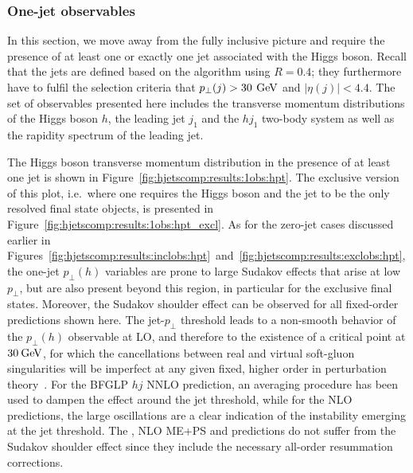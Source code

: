 \subsubsection{One-jet observables}
\label{sec:hjetscomp:results:1jobs}

In this section, we move away from the fully inclusive picture and
require the presence of at least one or exactly one jet associated with 
the Higgs boson. Recall that the jets are defined based on the
\antikt algorithm using $R=0.4$; they furthermore have to fulfil the selection
criteria that $p_\perp(j)>30\,\text{\:GeV}$ and $|\eta(j)|<4.4$. The set of
observables presented here includes the transverse momentum
distributions of the Higgs boson $h$, the leading jet $j_1$ and the
$hj_1$ two-body system as well as the rapidity spectrum of the leading
jet.

The Higgs boson transverse momentum distribution in the presence of at
least one jet is shown in
Figure~\ref{fig:hjetscomp:results:1obs:hpt}. The exclusive version of
this plot, i.e.~where one requires the Higgs boson and the jet to be 
the only resolved final state objects,
is presented in Figure~\ref{fig:hjetscomp:results:1obs:hpt_excl}. As
for the zero-jet cases discussed earlier in
Figures~\ref{fig:hjetscomp:results:inclobs:hpt}~and~\ref{fig:hjetscomp:results:exclobs:hpt},
the one-jet $p_\perp(h)$ variables are prone to large Sudakov effects that arise at low $p_\perp$, 
but are also present beyond
this region, in particular for the exclusive final states. Moreover, the
Sudakov shoulder effect can be observed for all fixed-order
predictions shown here. The jet-$p_\perp$ threshold leads to a
non-smooth behavior of the $p_\perp(h)$ observable at LO, and
therefore to the existence of a critical point at $30\text{\:GeV}$, for which
the cancellations between real and virtual soft-gluon singularities
will be imperfect at any given fixed, higher order in perturbation
theory~\cite{Catani:1997xc}. For the BFGLP $hj$ NNLO  prediction, an
averaging procedure has been used to dampen the effect around the jet
threshold, while for the NLO predictions, the large oscillations are a
clear indication of the instability emerging at the jet threshold. The
\NNLOPS, NLO ME+PS and \Resbos predictions do not suffer from
the Sudakov shoulder effect since they include the necessary all-order
resummation corrections.

